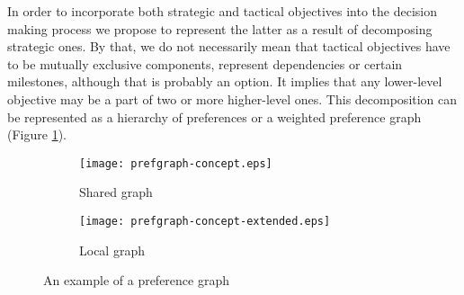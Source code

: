 



In order to incorporate both strategic and tactical objectives into the decision making process we propose to represent
the latter as a result of decomposing strategic ones. By that, we do not necessarily mean that tactical objectives have
to be mutually exclusive components, represent dependencies or certain milestones, although that is probably an option.
It implies that any lower-level objective may be a part of two or more higher-level ones. This decomposition can be
represented as a hierarchy of preferences or a weighted preference graph (Figure \ref{fig:prefgraph-concept-shared}).

\begin{figure}[hbt!]
    \centering
    \begin{subfigure}{.45\linewidth}
        \texttt{[image: prefgraph-concept.eps]}
        \caption{Shared graph}\label{fig:prefgraph-concept-shared}
    \end{subfigure}
    \begin{subfigure}{.45\linewidth}
        \texttt{[image: prefgraph-concept-extended.eps]}
        \caption{Local graph}\label{fig:prefgraph-concept-local}
    \end{subfigure}

    \caption{\small An example of a preference graph}
    \label{fig:prefgraph-concept}
\end{figure}

